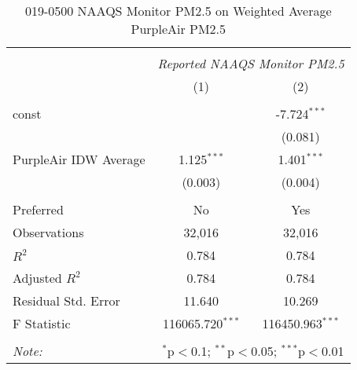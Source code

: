 \begin{table}[!htbp] \centering
  \caption{019-0500 NAAQS Monitor PM2.5 on Weighted Average PurpleAir PM2.5}
  \label{tab:reg_019-0500}
\begin{tabular}{@{\extracolsep{5pt}}lcc}
\\[-1.8ex]\hline
\hline \\[-1.8ex]
& \multicolumn{2}{c}{\textit{Reported NAAQS Monitor PM2.5}} \
\cr \cline{2-3}
\\[-1.8ex] & (1) & (2) \\
\hline \\[-1.8ex]
 const & & -7.724$^{***}$ \\
  & & (0.081) \\
 PurpleAir IDW Average & 1.125$^{***}$ & 1.401$^{***}$ \\
  & (0.003) & (0.004) \\
\hline \\[-1.8ex]
 Preferred & No & Yes \\
 Observations & 32,016 & 32,016 \\
 $R^2$ & 0.784 & 0.784 \\
 Adjusted $R^2$ & 0.784 & 0.784 \\
 Residual Std. Error & 11.640 & 10.269  \\
 F Statistic & 116065.720$^{***}$  & 116450.963$^{***}$  \\
\hline
\hline \\[-1.8ex]
\textit{Note:} & \multicolumn{2}{r}{$^{*}$p$<$0.1; $^{**}$p$<$0.05; $^{***}$p$<$0.01} \\
\end{tabular}
\end{table}